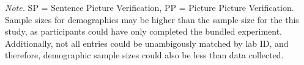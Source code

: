 \documentclass[
  man,floatsintext]{apa7}
\begin{document}
\begin{table}[tbp]
\begin{center}
\begin{threeparttable}
{}

\begin{tablenotes}[para]
\normalsize{\textit{Note.} SP = Sentence Picture Verification, PP = Picture Picture Verification. Sample sizes for demographics may be higher than the sample size for the this study, as participants could have only completed the bundled experiment. Additionally, not all entries could be unambigously matched by lab ID, and therefore, demographic sample sizes could also be less than data collected.}
\end{tablenotes}

\end{threeparttable}
\end{center}

\end{table}

\newpage
\end{document}
